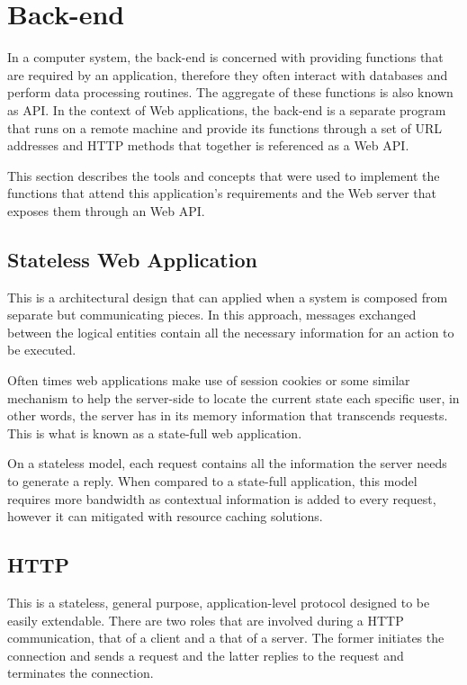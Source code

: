 \section{Back-end}\label{cha:concepts:sec:backend}
In a computer system, the back-end is concerned with providing functions that are required by an application, therefore they often interact with databases and perform data processing routines. The aggregate of these functions is also known as \gls{API}. In the context of Web applications, the back-end is a separate program that runs on a remote machine and provide its functions through a set of \gls{URL} addresses and \gls{HTTP} methods that together is referenced as a Web \gls{API}.

This section describes the tools and concepts that were used to implement the functions that attend this application's requirements and the Web server that exposes them through an Web \gls{API}.

\subsection{Stateless Web Application}
This is a architectural design that can applied when a system is composed from separate but communicating pieces. In this approach, messages exchanged between the logical entities contain all the necessary information for an action to be executed.

Often times web applications make use of session cookies or some similar mechanism to help the server-side to locate the current state each specific user, in other words, the server has in its memory information that transcends requests. This is what is known as a state-full web application.

On a stateless model, each request contains all the information the server needs to generate a reply. When compared to a state-full application, this model requires more bandwidth as contextual information is added to every request, however it can mitigated with resource caching solutions.

\subsection{\gls{HTTP}}
This is a stateless, general purpose, application-level protocol designed to be easily extendable. There are two roles that are involved during a \gls{HTTP} communication, that of a client and a that of a server. The former initiates the connection and sends a request and the latter replies to the request and terminates the connection.

